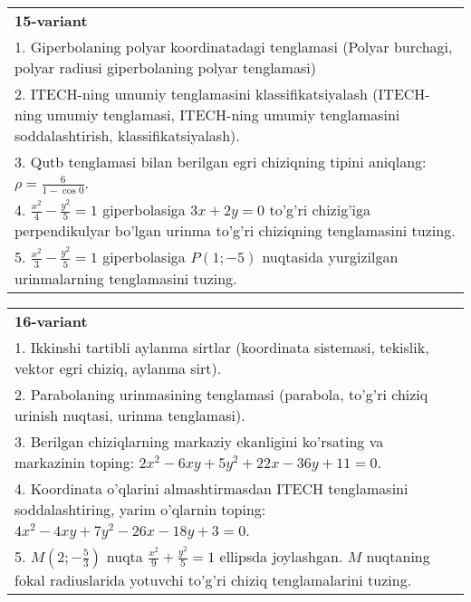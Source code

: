 \documentclass{article}
\begin{document}
\begin{tabular}{m{17cm}}
\textbf{15-variant}\\
1. Giperbolaning polyar koordinatadagi tenglamasi (Polyar burchagi, polyar radiusi giperbolaning polyar tenglamasi)\\

2. ITECH-ning umumiy tenglamasini klassifikatsiyalash (ITECH-ning umumiy tenglamasi, ITECH-ning umumiy tenglamasini soddalashtirish, klassifikatsiyalash).\\

3. Qutb tenglamasi bilan berilgan egri chiziqning tipini aniqlang: $\rho=\frac{6}{1-\cos 0}$.\\

4. $\frac{x^{2}}{4} - \frac{y^{2}}{5} = 1$ giperbolasiga $3x + 2y = 0$ to'g'ri chizig'iga perpendikulyar bo'lgan urinma to'g'ri chiziqning tenglamasini tuzing.\\

5. $\frac{x^{2}}{3} - \frac{y^{2}}{5} = 1$ giperbolasiga $P(1; - 5)$ nuqtasida yurgizilgan urinmalarning tenglamasini tuzing.
\end{tabular}
\vspace{1cm}


\begin{tabular}{m{17cm}}
\textbf{16-variant}\\
1. Ikkinshi tartibli aylanma sirtlar (koordinata sistemasi, tekislik, vektor egri chiziq, aylanma sirt).\\

2. Parabolaning urinmasining tenglamasi (parabola, to'g'ri chiziq urinish nuqtasi, urinma tenglamasi).\\

3. Berilgan chiziqlarning markaziy ekanligini ko'rsating va markazinin toping: $2x^{2}-6xy+5y^{2}+22x-36y+11=0$.\\

4. Koordinata o'qlarini almashtirmasdan ITECH tenglamasini soddalashtiring, yarim o'qlarnin toping: $4x^{2} - 4xy + 7y^{2} - 26x - 18y + 3 = 0$.\\

5. $M(2; - \frac{5}{3})$ nuqta $\frac{x^{2}}{9} + \frac{y^{2}}{5} = 1$ ellipsda joylashgan. $M$ nuqtaning fokal radiuslarida yotuvchi to'g'ri chiziq tenglamalarini tuzing.  
\end{tabular}
\vspace{1cm}
\end{document}
